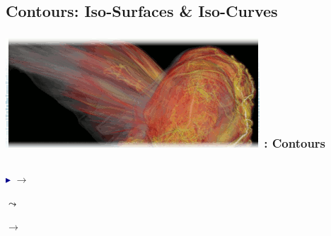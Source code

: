 \subsection{Contours: Iso-Surfaces \& Iso-Curves}
\begin{frame}
\frametitle{\href{https://wci.llnl.gov/simulation/computer-codes/visit/}{\includegraphics[height=.85cm]{figs/visit-logos/VisIt-03}} \hspace{-.85cm}{\bf \textcolor{lightgray}{VisIt}}: Contours}

\begin{columns}
\begin{column}{5cm}
        \textcolor{DarkBlue}{$\blacktriangleright$}
         $\rightarrow$ 

        \hspace{5.5mm}
        $\leadsto$ \framebox{\textcolor{DarkGreen}{\it hardyglobal}}

        \hspace{5.5mm}
        $\rightarrow$ \framebox{\textcolor{DarkBlue}{Draw}}


\end{column}
\end{columns}
\end{frame}

